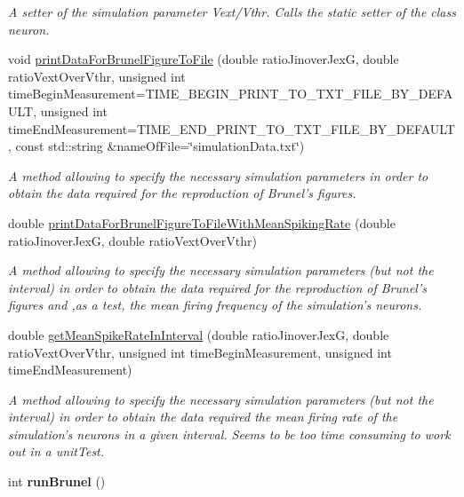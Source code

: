 \begin{DoxyCompactItemize}
\begin{DoxyCompactList}\small\item\em A setter of the simulation parameter Vext/\-Vthr. Calls the static setter of the class neuron. \end{DoxyCompactList}\item 
void \hyperlink{classSimulation_a842b9a8457fec98727ce838a8f165e87}{print\-Data\-For\-Brunel\-Figure\-To\-File} (double ratio\-Jinover\-Jex\-G, double ratio\-Vext\-Over\-Vthr, unsigned int time\-Begin\-Measurement=T\-I\-M\-E\-\_\-\-B\-E\-G\-I\-N\-\_\-\-P\-R\-I\-N\-T\-\_\-\-T\-O\-\_\-\-T\-X\-T\-\_\-\-F\-I\-L\-E\-\_\-\-B\-Y\-\_\-\-D\-E\-F\-A\-U\-L\-T, unsigned int time\-End\-Measurement=T\-I\-M\-E\-\_\-\-E\-N\-D\-\_\-\-P\-R\-I\-N\-T\-\_\-\-T\-O\-\_\-\-T\-X\-T\-\_\-\-F\-I\-L\-E\-\_\-\-B\-Y\-\_\-\-D\-E\-F\-A\-U\-L\-T, const std\-::string \&name\-Of\-File=\char`\"{}simulation\-Data.\-txt\char`\"{})
\begin{DoxyCompactList}\small\item\em A method allowing to specify the necessary simulation parameters in order to obtain the data required for the reproduction of Brunel's figures. \end{DoxyCompactList}\item 
double \hyperlink{classSimulation_a48419e2332a7186041433ca3b67fbdab}{print\-Data\-For\-Brunel\-Figure\-To\-File\-With\-Mean\-Spiking\-Rate} (double ratio\-Jinover\-Jex\-G, double ratio\-Vext\-Over\-Vthr)
\begin{DoxyCompactList}\small\item\em A method allowing to specify the necessary simulation parameters (but not the interval) in order to obtain the data required for the reproduction of Brunel's figures and ,as a test, the mean firing frequency of the simulation's neurons. \end{DoxyCompactList}\item 
double \hyperlink{classSimulation_acf963fa9fa6621ec7f98f743ffbd96f5}{get\-Mean\-Spike\-Rate\-In\-Interval} (double ratio\-Jinover\-Jex\-G, double ratio\-Vext\-Over\-Vthr, unsigned int time\-Begin\-Measurement, unsigned int time\-End\-Measurement)
\begin{DoxyCompactList}\small\item\em A method allowing to specify the necessary simulation parameters (but not the interval) in order to obtain the data required the mean firing rate of the simulation's neurons in a given interval. Seems to be too time consuming to work out in a unit\-Test. \end{DoxyCompactList}\item 
\hypertarget{classSimulation_a46506067eba805c7a282832b404c671f}{int {\bfseries run\-Brunel} ()}\label{classSimulation_a46506067eba805c7a282832b404c671f}

\end{DoxyCompactItemize}

